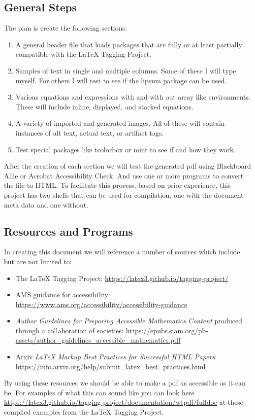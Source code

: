 \subsection{General Steps}
The plan is create the following sections:
\begin{enumerate}
    \item A general header file that loads packages that are fully or at least partially compatible with the \LaTeX\/ Tagging Project.
    \item Samples of text in single and multiple columns.  Some of these I will type myself.  For others I will test to see if the lipsum package can be used.
    \item Various equations and expressions with and with out array like environments.  These will include inline, displayed, and stacked equations.
    \item A variety of imported and generated images.  All of these will contain instances of alt text, actual text, or artifact tags.
    \item Test special packages like tcolorbox or mint to see if and how they work.
\end{enumerate}

After the creation of each section we will test the generated pdf using Blackboard Allie or Acrobat Accessibility Check.  And use one or more programs to convert the file to HTML. To facilitate this process, based on prior experience, this project has two shells that can be used for compilation, one with the document meta data and one without.

\subsection{Resources and Programs}

In creating this document we will reference a number of sources which include but are not limited to:
\begin{itemize}
    \item The \LaTeX\/ Tagging Project: \url{https://latex3.github.io/tagging-project/}
    \item AMS guidance for accessibility: \url{https://www.ams.org/accessibility/accessibility-guidance}
    \item \textit{Author Guidelines for Preparing Accessible Mathematics Content} produced through a collaboration of societies: \url{https://epubs.siam.org/pb-assets/author_guidelines_accessible_mathematics.pdf}
    \item Arxiv \textit{LaTeX Markup Best Practices for Successful HTML Papers}: \url{https://info.arxiv.org/help/submit_latex_best_practices.html}
\end{itemize}
By using these resources we should be able to make a pdf as accessible as it can be.  For examples of what this can sound like you can look here \url{https://latex3.github.io/tagging-project/documentation/wtpdf/fulldoc} at these complied examples from the \LaTeX\/ Tagging Project.

